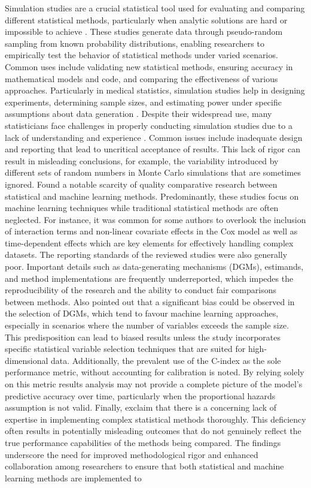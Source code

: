 \noindent 
Simulation studies are a crucial statistical tool used for evaluating and comparing different statistical methods, particularly when analytic solutions are hard or impossible to achieve \parencite{morris_using_2019}. These studies generate data through pseudo-random sampling from known probability distributions, enabling researchers to empirically test the behavior of statistical methods under varied scenarios. Common uses include validating new statistical methods, ensuring accuracy in mathematical models and code, and comparing the effectiveness of various approaches. Particularly in medical statistics, simulation studies help in designing experiments, determining sample sizes, and estimating power under specific assumptions about data generation \parencite{morris_using_2019}. Despite their widespread use, many statisticians face challenges in properly conducting simulation studies due to a lack of understanding and experience \parencite{morris_using_2019}. Common issues include inadequate design and reporting that lead to uncritical acceptance of results. This lack of rigor can result in misleading conclusions, for example, the variability introduced by different sets of random numbers in Monte Carlo simulations that are sometimes ignored. \parencite{smith_scoping_2022} Found a notable scarcity of quality comparative research between statistical and machine learning methods. Predominantly, these studies focus on machine learning techniques while traditional statistical methods are often neglected. For instance, it was common for some authors to overlook the inclusion of interaction terms and non-linear covariate effects in the Cox model as well as time-dependent effects which are key elements for effectively handling complex datasets. The reporting standards of the reviewed studies were also generally poor. Important details such as data-generating mechanisms (DGMs), estimands, and method implementations are frequently underreported, which impedes the reproducibility of the research and the ability to conduct fair comparisons between methods. \parencite{smith_scoping_2022} Also pointed out that a significant bias could be observed in the selection of DGMs, which tend to favour machine learning approaches, especially in scenarios where the number of variables exceeds the sample size. This predisposition can lead to biased results unless the study incorporates specific statistical variable selection techniques that are suited for high-dimensional data. Additionally, the prevalent use of the C-index as the sole performance metric, without accounting for calibration is noted. By relying solely on this metric results analysis may not provide a complete picture of the model's predictive accuracy over time, particularly when the proportional hazards assumption is not valid. Finally, \parencite{smith_scoping_2022} exclaim that there is a concerning lack of expertise in implementing complex statistical methods thoroughly. This deficiency often results in potentially misleading outcomes that do not genuinely reflect the true performance capabilities of the methods being compared. The findings underscore the need for improved methodological rigor and enhanced collaboration among researchers to ensure that both statistical and machine learning methods are implemented to 